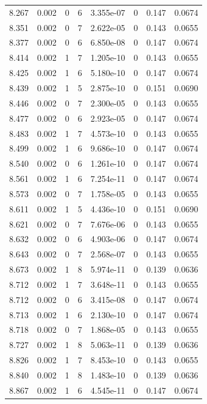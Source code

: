 \documentclass[preview]{standalone}
\begin{document}
{{{{{{{{\begin{tabular}{L{1.2cm}C{1.2cm} C{0.3cm}C{0.5cm} C{1.4cm}C{1.4cm} C{1.4cm}C{1.4cm}}
  8.267  &  0.002  & 0     &  6 &  3.355e-07  & 0  & 0.147 &  0.0674   \\ 
  8.351  &  0.002  & 0     &  7 &  2.622e-05  & 0  & 0.143 &  0.0655   \\ 
  8.377  &  0.002  & 0     &  6 &  6.850e-08  & 0  & 0.147 &  0.0674   \\ 
  8.414  &  0.002  & 1     &  7 &  1.205e-10  & 0  & 0.143 &  0.0655   \\ 
  8.425  &  0.002  & 1     &  6 &  5.180e-10  & 0  & 0.147 &  0.0674   \\ 
  8.439  &  0.002  & 1     &  5 &  2.875e-10  & 0  & 0.151 &  0.0690   \\ 
  8.446  &  0.002  & 0     &  7 &  2.300e-05  & 0  & 0.143 &  0.0655   \\ 
  8.477  &  0.002  & 0     &  6 &  2.923e-05  & 0  & 0.147 &  0.0674   \\ 
  8.483  &  0.002  & 1     &  7 &  4.573e-10  & 0  & 0.143 &  0.0655   \\ 
  8.499  &  0.002  & 1     &  6 &  9.686e-10  & 0  & 0.147 &  0.0674   \\ 
  8.540  &  0.002  & 0     &  6 &  1.261e-10  & 0  & 0.147 &  0.0674   \\ 
  8.561  &  0.002  & 1     &  6 &  7.254e-11  & 0  & 0.147 &  0.0674   \\ 
  8.573  &  0.002  & 0     &  7 &  1.758e-05  & 0  & 0.143 &  0.0655   \\ 
  8.611  &  0.002  & 1     &  5 &  4.436e-10  & 0  & 0.151 &  0.0690   \\ 
  8.621  &  0.002  & 0     &  7 &  7.676e-06  & 0  & 0.143 &  0.0655   \\ 
  8.632  &  0.002  & 0     &  6 &  4.903e-06  & 0  & 0.147 &  0.0674   \\ 
  8.643  &  0.002  & 0     &  7 &  2.568e-07  & 0  & 0.143 &  0.0655   \\ 
  8.673  &  0.002  & 1     &  8 &  5.974e-11  & 0  & 0.139 &  0.0636   \\ 
  8.712  &  0.002  & 1     &  7 &  3.648e-11  & 0  & 0.143 &  0.0655   \\ 
  8.712  &  0.002  & 0     &  6 &  3.415e-08  & 0  & 0.147 &  0.0674   \\ 
  8.713  &  0.002  & 1     &  6 &  2.130e-10  & 0  & 0.147 &  0.0674   \\ 
  8.718  &  0.002  & 0     &  7 &  1.868e-05  & 0  & 0.143 &  0.0655   \\ 
  8.727  &  0.002  & 1     &  8 &  5.063e-11  & 0  & 0.139 &  0.0636   \\ 
  8.826  &  0.002  & 1     &  7 &  8.453e-10  & 0  & 0.143 &  0.0655   \\ 
  8.840  &  0.002  & 1     &  8 &  1.483e-10  & 0  & 0.139 &  0.0636   \\ 
  8.867  &  0.002  & 1     &  6 &  4.545e-11  & 0  & 0.147 &  0.0674   \\ 
\hline 
\end{tabular} 

}}}}}}}}
\end{document}
